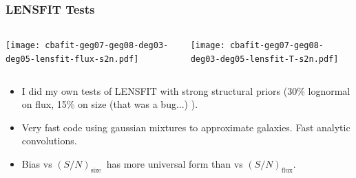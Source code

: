 \documentclass{beamer}
\newcommand{\snT}{$(S/N)_{\textrm{size}}$}
\newcommand{\snflux}{$(S/N)_{\textrm{flux}}$}
\begin{document}
\frame
{
    \frametitle{LENSFIT Tests}

    \begin{columns}
        
        \begin{column}{0.5\textwidth}
            \texttt{[image: cbafit-geg07-geg08-deg03-deg05-lensfit-flux-s2n.pdf]}
        \end{column}

        \begin{column}{0.5\textwidth}
            \texttt{[image: cbafit-geg07-geg08-deg03-deg05-lensfit-T-s2n.pdf]}
        \end{column}
    \end{columns}

    \fontsize{9}{0.8\baselineskip}
    \begin{itemize}
        \item I did my own tests of LENSFIT with strong structural priors (30\% lognormal
            on flux, 15\% on size (that was a bug...) ).

        \item Very fast code using gaussian mixtures to approximate galaxies.  Fast
            analytic convolutions.

        \item Bias vs \snT\ has more universal form than vs \snflux.
    \end{itemize}

}

\end{document}
